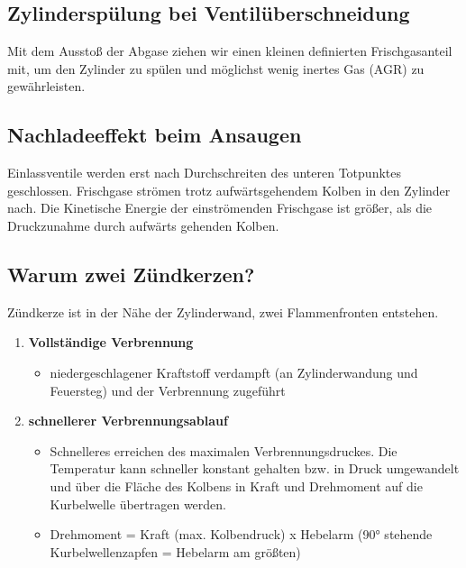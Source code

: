 \subsection{Zylinderspülung bei
Ventilüberschneidung}\label{zylinderspuelung-bei-ventilueberschneidung}

Mit dem Ausstoß der Abgase ziehen wir einen kleinen definierten
Frischgasanteil mit, um den Zylinder zu spülen und möglichst wenig
inertes Gas (AGR) zu gewährleisten.

\subsection{Nachladeeffekt beim
Ansaugen}\label{nachladeeffekt-beim-ansaugen}

Einlassventile werden erst nach Durchschreiten des unteren Totpunktes
geschlossen. Frischgase strömen trotz aufwärtsgehendem Kolben in den
Zylinder nach. Die Kinetische Energie der einströmenden Frischgase ist
größer, als die Druckzunahme durch aufwärts gehenden Kolben.

\subsection{Warum zwei Zündkerzen?}\label{warum-zwei-zuendkerzen}

Zündkerze ist in der Nähe der Zylinderwand, zwei Flammenfronten
entstehen.

\begin{enumerate}
\item
  \textbf{Vollständige Verbrennung}

  \begin{itemize}
  \item
    niedergeschlagener Kraftstoff verdampft (an Zylinderwandung und
    Feuersteg) und der Verbrennung zugeführt
  \end{itemize}
\item
  \textbf{schnellerer Verbrennungsablauf}

  \begin{itemize}
  \item
    Schnelleres erreichen des maximalen Verbrennungsdruckes. Die
    Temperatur kann schneller konstant gehalten bzw. in Druck
    umgewandelt und über die Fläche des Kolbens in Kraft und Drehmoment
    auf die Kurbelwelle übertragen werden.
  \item
    Drehmoment = Kraft (max. Kolbendruck) x Hebelarm (90° stehende
    Kurbelwellenzapfen = Hebelarm am größten)
  \end{itemize}
\end{enumerate}

